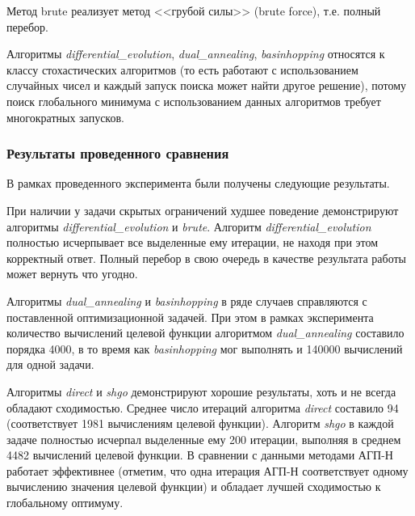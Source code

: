 \documentclass[a4paper,12pt,russian]{article}
\begin{document}
Метод brute реализует метод <<грубой силы>> (brute force), т.е. полный перебор.

Алгоритмы \textit{differential\_evolution}, \textit{dual\_annealing}, \textit{basinhopping} относятся к классу стохастических алгоритмов (то есть работают с использованием случайных чисел и каждый запуск поиска может найти другое решение), потому поиск глобального минимума с использованием данных алгоритмов требует многократных запусков.

\subsubsection{Результаты проведенного сравнения}

В рамках проведенного эксперимента были получены следующие результаты.

При наличии у задачи скрытых ограничений худшее поведение демонстрируют алгоритмы \textit{differential\_evolution} и \textit{brute}. Алгоритм \textit{differential\_evolution} полностью исчерпывает все выделенные ему итерации, не находя при этом корректный ответ. Полный перебор в свою очередь в качестве результата работы может вернуть что угодно. 

Алгоритмы \textit{dual\_annealing} и \textit{basinhopping} в ряде случаев справляются с поставленной оптимизационной задачей. При этом в рамках эксперимента количество вычислений целевой функции алгоритмом \textit{dual\_annealing} составило порядка 4000, в то время как \textit{basinhopping} мог выполнять и 140000 вычислений для одной задачи.

Алгоритмы \textit{direct} и \textit{shgo} демонстрируют хорошие результаты, хоть и не всегда обладают сходимостью. Среднее число итераций алгоритма \textit{direct} составило 94 (соответствует 1981 вычислениям целевой функции). Алгоритм \textit{shgo} в каждой задаче полностью исчерпал выделенные ему 200 итерации, выполняя в среднем 4482 вычислений целевой функции. В сравнении с данными методами АГП-Н работает эффективнее (отметим, что одна итерация АГП-Н соответствует одному вычислению значения целевой функции) и обладает лучшей сходимостью к глобальному оптимуму.
\end{document}
